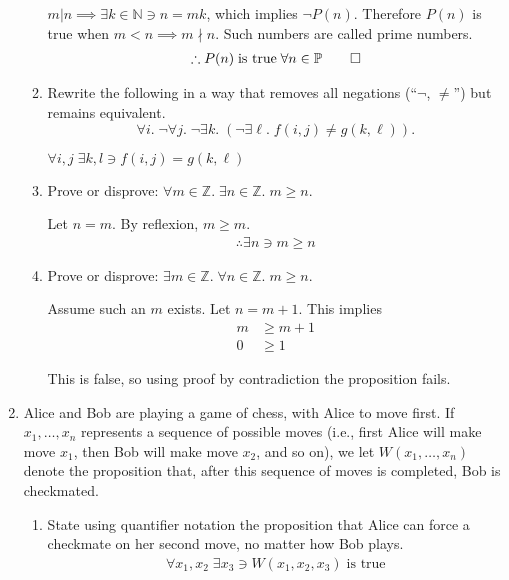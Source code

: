\documentclass[11pt,fleqn]{article}
\newcommand{\N}{\mathbb{N}}
\newcommand{\Z}{\mathbb{Z}}
\begin{document}
\begin{enumerate}
\begin{enumerate}
$m | n \implies \exists k \in \N \ni n=mk$, which implies $\lnot P(n)$.  Therefore $P(n)$ is true when $m<n \implies m \nmid n$.  Such numbers are called prime numbers.
\begin{align}
\therefore P(n)\;\text{is true}\;\forall n \in \mathbb{P}\qed
\end{align}

\item Rewrite the following in a way that
removes all negations (``$\neg$, $\ne$'') but remains equivalent.
\[ \forall i . \; \neg \forall j . \;
\neg \exists k . \; 
(\neg \exists \ell . \; f(i,j) \ne g(k,\ell)). \]

$\forall i,j\;\exists k,l \ni f(i,j) = g(k,\ell)$

\item Prove or disprove:
$\forall m \in \Z . \; \exists n \in \Z . \; m \ge n$.

Let $n = m$.  By reflexion, $m \ge m$.
\begin{align}
\therefore \exists n \ni m \ge n
\end{align}

\item Prove or disprove:
$\exists m \in \Z . \; \forall n \in \Z . \; m \ge n$.

Assume such an $m$ exists.  Let $n = m+1$.  This implies
\begin{align}
  m &\ge m+1\\
  0 &\ge 1
\end{align}

This is false, so using proof by contradiction the proposition fails.

\end{enumerate}

\item
Alice and Bob are playing a game of chess,
with Alice to move first.
If $x_1,\dots,x_n$ represents a sequence of possible moves
(i.e., first Alice will make move $x_1$, then Bob will make move $x_2$,
and so on),
we let $W(x_1,\dots,x_n)$ denote the proposition that,
after this sequence of moves is completed,
Bob is checkmated.
\begin{enumerate}
\item State using quantifier notation the proposition that Alice
can force a checkmate on her second move, no matter how Bob plays.
\begin{align}
\forall x_1, x_2\;\exists x_3 \ni W(x_1, x_2, x_3)\;\text{is true}
\end{align}


\end{enumerate}
\end{enumerate}
\end{document}
